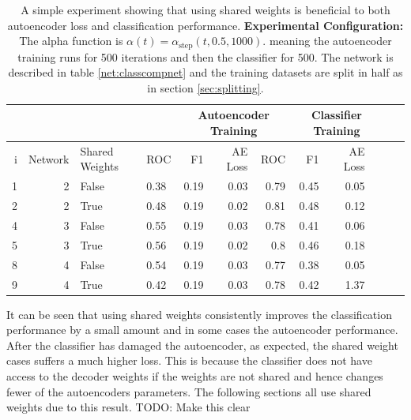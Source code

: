           \begin{table}[!h] \centering
          {\footnotesize
          \begin{tabular}{rrllrrrrrrrr}
            &&&&   \multicolumn{3}{|c|}{Autoencoder Training} &  \multicolumn{3}{c|}{Classifier Training}    \\
          \hline
            i & Network               &   Shared Weights &    ROC&F1&AE Loss & ROC & F1 & AE Loss \\
          \hline
           1 & 2    & False     &    0.38 &   0.19 &     0.03 &    0.79 &   0.45 &     0.05 \\
           2 & 2    & True      &    0.48 &   0.19 &     0.02 &    0.81 &   0.48 &     0.12 \\
          \hline
          4 & 3    & False     &    0.55 &   0.19 &     0.03 &    0.78 &   0.41 &     0.06 \\
          5 & 3    & True      &    0.56 &   0.19 &     0.02 &    0.8  &   0.46 &     0.18 \\
          \hline
          8 & 4     & False     &    0.54 &   0.19 &     0.03 &    0.77 &   0.38 &     0.05 \\
          9 & 4     & True      &    0.42 &   0.19 &     0.03 &    0.78 &   0.42 &     1.37 \\
           \hline
         \end{tabular}}\caption{A simple experiment showing that using shared weights is beneficial
         to both autoencoder loss and classification performance. {\bf Experimental Configuration:}
          The alpha function is $\alpha(t)=\alpha_{\text{step}}(t,0.5,1000)$.
          meaning the autoencoder training runs for 500 iterations and then the classifier for 500.
          The network is described in table \ref{net:classcompnet} and the training datasets are split in half as in section
          \ref{sec:splitting}.} \label{tab:sharedweights} \end{table}

          It can be seen that using shared weights consistently improves the classification
          performance by a small amount and in some cases the autoencoder performance. After the classifier has
          damaged the autoencoder, as expected, the shared weight cases suffers a much higher loss. This is
          because the classifier does not have access to the decoder weights if the weights are not shared and hence
          changes fewer of the autoencoders parameters. The following sections all use shared weights due to this result.
          {\color{red}TODO: Make this clear}
        \newpage
